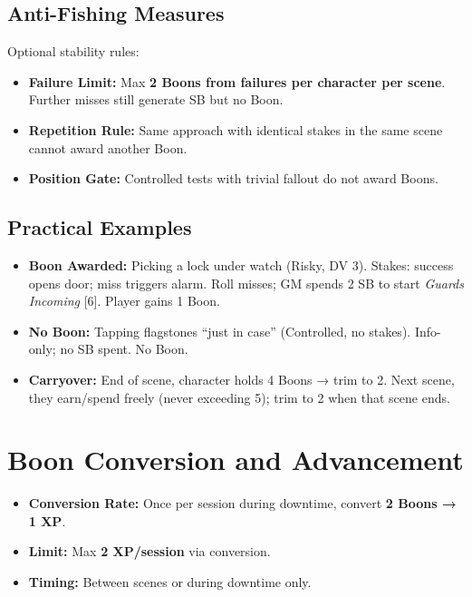 \subsection{Anti-Fishing Measures}
\label{subsec:anti-fishing}
Optional stability rules:
\begin{itemize}
\item \textbf{Failure Limit:} Max \textbf{2 Boons from failures per character per scene}. Further misses still generate SB but no Boon.
\item \textbf{Repetition Rule:} Same approach with identical stakes in the same scene cannot award another Boon.
\item \textbf{Position Gate:} Controlled tests with trivial fallout do not award Boons.
\end{itemize}

\subsection{Practical Examples}
\label{subsec:boon-examples}
\begin{itemize}
\item \textbf{Boon Awarded:} Picking a lock under watch (Risky, DV 3). Stakes: success opens door; miss triggers alarm. Roll misses; GM spends 2 SB to start \emph{Guards Incoming} [6]. Player gains 1 Boon.
\item \textbf{No Boon:} Tapping flagstones “just in case” (Controlled, no stakes). Info-only; no SB spent. No Boon.
\item \textbf{Carryover:} End of scene, character holds 4 Boons → trim to 2. Next scene, they earn/spend freely (never exceeding 5); trim to 2 when that scene ends.
\end{itemize}

\section{Boon Conversion and Advancement}
\label{sec:boon-conversion}
\begin{itemize}
\item \textbf{Conversion Rate:} Once per session during downtime, convert \textbf{2 Boons → 1 XP}. 
\item \textbf{Limit:} Max \textbf{2 XP/session} via conversion. 
\item \textbf{Timing:} Between scenes or during downtime only. 
\end{itemize}

